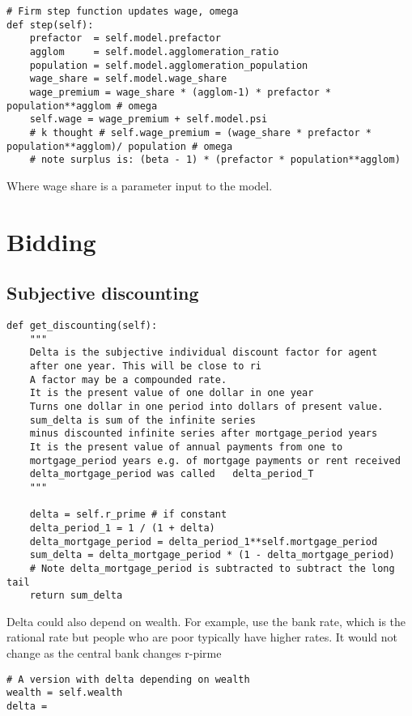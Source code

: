 \begin{lstlisting}
# Firm step function updates wage, omega
def step(self):
    prefactor  = self.model.prefactor
    agglom     = self.model.agglomeration_ratio
    population = self.model.agglomeration_population
    wage_share = self.model.wage_share  
    wage_premium = wage_share * (agglom-1) * prefactor * population**agglom # omega
    self.wage = wage_premium + self.model.psi
    # k thought # self.wage_premium = (wage_share * prefactor * population**agglom)/ population # omega    
    # note surplus is: (beta - 1) * (prefactor * population**agglom)
\end{lstlisting}

Where wage share is a parameter input to the model.

\section{Bidding}
\subsection{Subjective discounting}
\begin{lstlisting}
def get_discounting(self):
    """
    Delta is the subjective individual discount factor for agent
    after one year. This will be close to ri
    A factor may be a compounded rate.
    It is the present value of one dollar in one year 
    Turns one dollar in one period into dollars of present value.
    sum_delta is sum of the infinite series 
    minus discounted infinite series after mortgage_period years
    It is the present value of annual payments from one to 
    mortgage_period years e.g. of mortgage payments or rent received
    delta_mortgage_period was called   delta_period_T
    """
    
    delta = self.r_prime # if constant 
    delta_period_1 = 1 / (1 + delta) 
    delta_mortgage_period = delta_period_1**self.mortgage_period
    sum_delta = delta_mortgage_period * (1 - delta_mortgage_period)
    # Note delta_mortgage_period is subtracted to subtract the long tail
    return sum_delta
\end{lstlisting}

Delta could also depend on wealth. For example,  use the bank rate, which is the rational rate but people who are poor typically have higher rates.  It would not change as the central bank changes r-pirme

\begin{lstlisting}
# A version with delta depending on wealth
wealth = self.wealth
delta =
\end{lstlisting}
 
